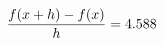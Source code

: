 \documentclass[preview]{standalone}
\begin{document}
\begin{align*}
\special{dvisvgm:raw <g id='unique000'>}\frac{f(x+h)-f(x)}{h} = 4.588\special{dvisvgm:raw </g>}
\end{align*}
\end{document}
